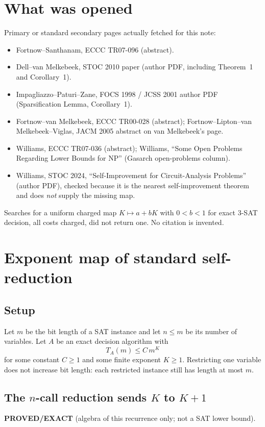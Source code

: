 \documentclass[11pt]{article}
\begin{document}
\section*{What was opened}
Primary or standard secondary pages actually fetched for this note:
\begin{itemize}
\item Fortnow--Santhanam, ECCC TR07-096 (abstract).
\item Dell--van Melkebeek, STOC 2010 paper (author PDF, including Theorem~1 and Corollary~1).
\item Impagliazzo--Paturi--Zane, FOCS 1998 / JCSS 2001 author PDF (Sparsification Lemma, Corollary~1).
\item Fortnow--van Melkebeek, ECCC TR00-028 (abstract); Fortnow--Lipton--van Melkebeek--Viglas, JACM 2005 abstract on van Melkebeek's page.
\item Williams, ECCC TR07-036 (abstract); Williams, ``Some Open Problems Regarding Lower Bounds for NP'' (Gasarch open-problems column).
\item Williams, STOC 2024, ``Self-Improvement for Circuit-Analysis Problems'' (author PDF), checked because it is the nearest self-improvement theorem and does \emph{not} supply the missing map.
\end{itemize}
Searches for a uniform charged map $K\mapsto a+bK$ with $0<b<1$ for exact 3-SAT decision, all costs charged, did not return one. No citation is invented.

\section{Exponent map of standard self-reduction}
\label{sec:map}

\subsection*{Setup}
Let $m$ be the bit length of a SAT instance and let $n\le m$ be its number of variables. Let $A$ be an exact decision algorithm with
\[
T_A(m)\le C\, m^{K}
\]
for some constant $C\ge 1$ and some finite exponent $K\ge 1$. Restricting one variable does not increase bit length: each restricted instance still has length at most $m$.

\subsection*{The $n$-call reduction sends $K$ to $K+1$}
\textbf{PROVED/EXACT} (algebra of this recurrence only; not a SAT lower bound).
\end{document}

